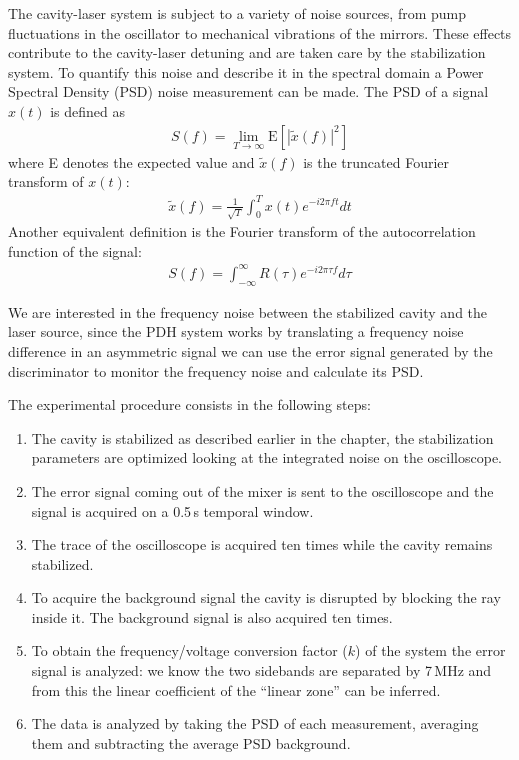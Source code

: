 The cavity-laser system is subject to a variety of noise sources, from pump fluctuations in the oscillator to mechanical vibrations of the mirrors. These effects contribute to the cavity-laser detuning and are taken care by the stabilization system. To quantify this noise and describe it in the spectral domain a Power Spectral Density (PSD) noise measurement can be made. The PSD of a signal $x(t)$ is defined as
\begin{align}
	S(f) = \lim_{T\rightarrow\infty}\mathrm{E}\left[|\tilde x(f)|^2\right]
\end{align}
where E denotes the expected value and $\tilde x(f)$ is the truncated Fourier transform of $x(t)$:
\begin{align}
	\tilde x(f) = \frac{1}{\sqrt{T}} \int_{0}^{T}x(t) e^{-i2\pi ft} dt
\end{align}
Another equivalent definition is the Fourier transform of the autocorrelation function of the signal:
\begin{align}
	S(f) = \int_{-\infty}^{\infty} R(\tau) e^{-i2\pi\tau f} d\tau
\end{align}

We are interested in the frequency noise between the stabilized cavity and the laser source, since the PDH system works by translating a frequency noise difference in an asymmetric signal we can use the error signal generated by the discriminator to monitor the frequency noise and calculate its PSD.

The experimental procedure consists in the following steps:
\begin{enumerate}
	\item The cavity is stabilized as described earlier in the chapter, the stabilization parameters are optimized looking at the integrated noise on the oscilloscope.
	\item The error signal coming out of the mixer is sent to the oscilloscope and the signal is acquired on a 0.5\,s temporal window.
	\item The trace of the oscilloscope is acquired ten times while the cavity remains stabilized.
	\item To acquire the background signal the cavity is disrupted by blocking the ray inside it. The background signal is also acquired ten times.
	\item To obtain the frequency/voltage conversion factor ($k$) of the system the error signal is analyzed: we know the two sidebands are separated by 7\,MHz and from this the linear coefficient of the ``linear zone'' can be inferred.
	\item The data is analyzed by taking the PSD of each measurement, averaging them and subtracting the average PSD background.
\end{enumerate}

